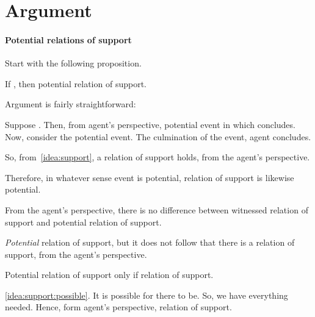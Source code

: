 \section{Argument}
\label{cha:fcs:sec:argument}

\paragraph{Potential relations of support}

\begin{note}
  Start with the following proposition.
  \begin{proposition}
    If \fc{}, then potential relation of support.
  \end{proposition}

  Argument is fairly straightforward:
  \begin{argument}
    Suppose \fc{}.
    Then, from agent's perspective, potential event in which concludes.
    Now, consider the potential event.
    The culmination of the event, agent concludes.

    So, from~\autoref{idea:support}, a relation of support holds, from the agent's perspective.

    Therefore, in whatever sense event is potential, relation of support is likewise potential.
  \end{argument}
  From the agent's perspective, there is no difference between witnessed relation of support and potential relation of support.
\end{note}

\begin{note}
  \emph{Potential} relation of support, but it does not follow that there is a relation of support, from the agent's perspective.
\end{note}

\begin{note}
  \begin{proposition}
    Potential relation of support only if relation of support.
  \end{proposition}

  \begin{argument}
    \autoref{idea:support:possible}.
    It is possible for there to be.
    So, we have everything needed.
    Hence, form agent's perspective, relation of support.
  \end{argument}
\end{note}

